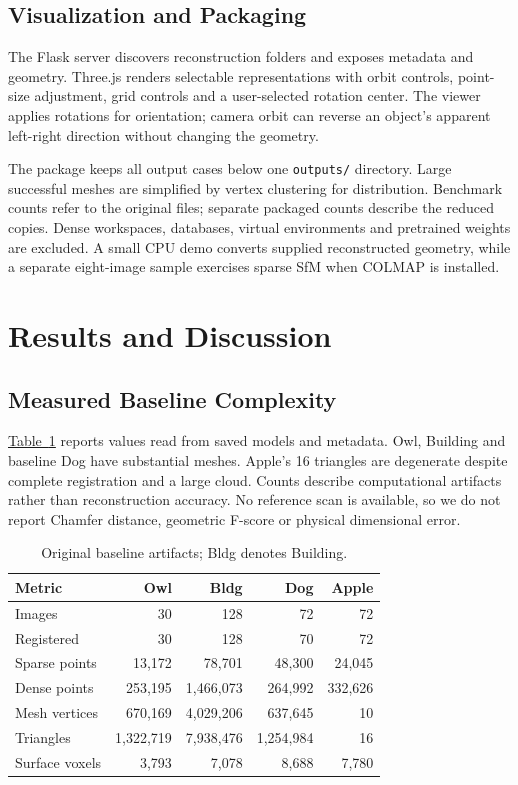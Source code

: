 \documentclass[conference]{IEEEtran}
\begin{document}
\subsection{Visualization and Packaging}
The Flask server discovers reconstruction folders and exposes metadata and geometry. Three.js renders selectable representations with orbit controls, point-size adjustment, grid controls and a user-selected rotation center. The viewer applies rotations for orientation; camera orbit can reverse an object's apparent left-right direction without changing the geometry.

The package keeps all output cases below one \texttt{outputs/} directory. Large successful meshes are simplified by vertex clustering for distribution. Benchmark counts refer to the original files; separate packaged counts describe the reduced copies. Dense workspaces, databases, virtual environments and pretrained weights are excluded. A small CPU demo converts supplied reconstructed geometry, while a separate eight-image sample exercises sparse SfM when COLMAP is installed.

\section{Results and Discussion}
\subsection{Measured Baseline Complexity}
\hyperref[tab:baseline]{Table~\ref*{tab:baseline}} reports values read from saved models and metadata. Owl, Building and baseline Dog have substantial meshes. Apple's 16 triangles are degenerate despite complete registration and a large cloud. Counts describe computational artifacts rather than reconstruction accuracy. No reference scan is available, so we do not report Chamfer distance, geometric F-score or physical dimensional error.

\begin{table}[t]
\centering\caption{Original baseline artifacts; Bldg denotes Building.}
\label{tab:baseline}\small
\setlength{\tabcolsep}{3pt}
\begin{tabular}{lrrrr}\toprule
Metric & Owl & Bldg & Dog & Apple\\\midrule
Images & 30 &128 &72 &72\\
Registered &30 &128 &70 &72\\
Sparse points &13,172 &78,701 &48,300 &24,045\\
Dense points &253,195 &1,466,073 &264,992 &332,626\\
Mesh vertices &670,169 &4,029,206 &637,645 &10\\
Triangles &1,322,719 &7,938,476 &1,254,984 &16\\
Surface voxels &3,793 &7,078 &8,688 &7,780\\\bottomrule
\end{tabular}
\end{table}
\end{document}

